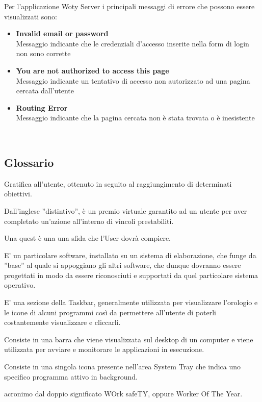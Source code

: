 Per l'applicazione Woty Server i principali messaggi di errore che possono essere visualizzati sono:
\begin{itemize}
\item \textbf{Invalid email or password}\\
Messaggio indicante che le credenziali d'accesso inserite nella form di login non sono corrette

\item \textbf{You are not authorized to access this page}\\
Messaggio indicante un tentativo di accesso non autorizzato ad una pagina cercata dall'utente

\item \textbf{Routing Error}\\
Messaggio indicante che la pagina cercata non è stata trovata o è inesistente
\end{itemize}


\ \
\subsection{Glossario}

\label{glossario}


Gratifica all'utente, ottenuto in seguito al raggiungimento di determinati obiettivi.



Dall'inglese ''distintivo'', è un premio virtuale garantito ad un utente per aver completato
un'azione all'interno di vincoli prestabiliti.



Una quest è una una sfida che l'User dovrà compiere.


E' un particolare software, installato su un sistema di elaborazione, che funge da ''base'' al quale si appoggiano gli altri software, che dunque dovranno essere progettati in modo da essere riconosciuti e supportati da quel particolare sistema operativo.

E' una sezione della Taskbar, generalmente utilizzata per visualizzare l'orologio e le icone di alcuni programmi così da permettere all'utente di poterli costantemente visualizzare e cliccarli.



\newpage


Consiste in una barra che viene visualizzata sul desktop di un computer e viene utilizzata per avviare e monitorare le applicazioni in esecuzione.

Consiste in una singola icona presente nell'area System Tray che indica uno specifico programma attivo in background. 


acronimo dal doppio significato WOrk safeTY, oppure Worker Of The Year.



